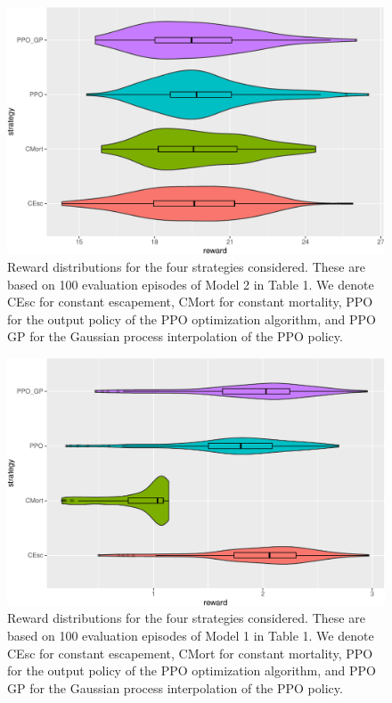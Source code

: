 \documentclass{article}
\begin{document}
\begin{figure}
\includegraphics[width=6in]{manuscript_files/figure-latex/main_31-1} \caption{Reward distributions for the four strategies considered. These are based on 100 evaluation episodes of Model 2 in Table 1. We denote CEsc for constant escapement, CMort for constant mortality, PPO for the output policy of the PPO optimization algorithm, and PPO GP for the Gaussian process interpolation of the PPO policy.}\label{fig:main_31}
\end{figure}

\begin{figure}
\includegraphics[width=6in]{manuscript_files/figure-latex/main_11-1} \caption{Reward distributions for the four strategies considered. These are based on 100 evaluation episodes of Model 1 in Table 1. We denote CEsc for constant escapement, CMort for constant mortality, PPO for the output policy of the PPO optimization algorithm, and PPO GP for the Gaussian process interpolation of the PPO policy.}\label{fig:main_11}
\end{figure}
\end{document}
